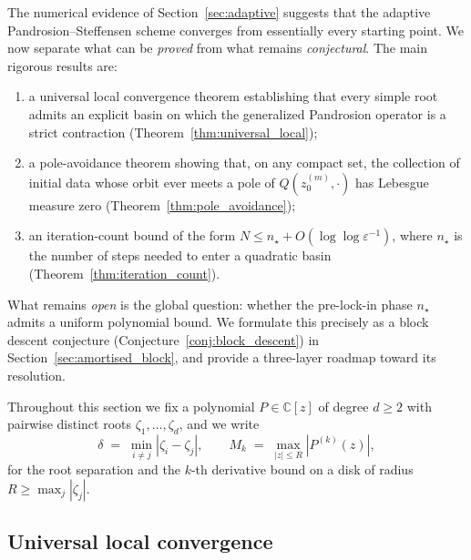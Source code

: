 \documentclass[11pt,a4paper]{article}
\theoremstyle{definition}
\newcommand{\CC}{\mathbb{C}}
\begin{document}
The numerical evidence of Section~\ref{sec:adaptive} suggests that the adaptive Pandrosion--Steffensen scheme converges from essentially every starting point.  We now separate what can be \emph{proved} from what remains \emph{conjectural}.  The main rigorous results are:
\begin{enumerate}
  \item[(i)] a universal local convergence theorem establishing that every simple root admits an explicit basin on which the generalized Pandrosion operator is a strict contraction (Theorem~\ref{thm:universal_local});
  \item[(ii)] a pole-avoidance theorem showing that, on any compact set, the collection of initial data whose orbit ever meets a pole of $Q(z_0^{(m)}, \cdot)$ has Lebesgue measure zero (Theorem~\ref{thm:pole_avoidance});
  \item[(iii)] an iteration-count bound of the form $N \leq n_\star + O(\log\log \varepsilon^{-1})$, where $n_\star$ is the number of steps needed to enter a quadratic basin (Theorem~\ref{thm:iteration_count}).
\end{enumerate}
What remains \emph{open} is the global question: whether the pre-lock-in phase $n_\star$ admits a uniform polynomial bound.  We formulate this precisely as a block descent conjecture (Conjecture~\ref{conj:block_descent}) in Section~\ref{sec:amortised_block}, and provide a three-layer roadmap toward its resolution.

Throughout this section we fix a polynomial $P \in \CC[z]$ of degree $d \geq 2$ with pairwise distinct roots $\zeta_1, \ldots, \zeta_d$, and we write
\[
  \delta \;=\; \min_{i \neq j} |\zeta_i - \zeta_j|,
  \qquad
  M_k \;=\; \max_{|z| \leq R} |P^{(k)}(z)|,
\]
for the root separation and the $k$-th derivative bound on a disk of radius $R \geq \max_j |\zeta_j|$.

\subsection{Universal local convergence}
\end{document}
